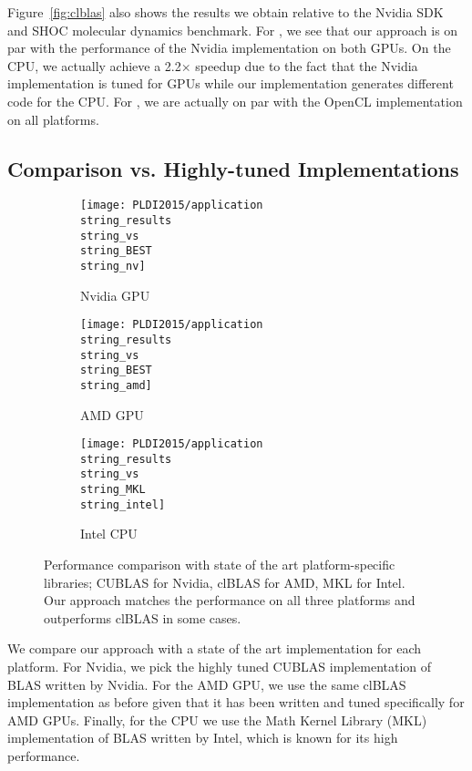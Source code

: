 Figure~\ref{fig:clblas} also shows the results we obtain relative to the Nvidia SDK  and SHOC molecular dynamics  benchmark.
For , we see that our approach is on par with the performance of the Nvidia implementation on both GPUs.
On the CPU, we actually achieve a 2.2$\times$ speedup due to the fact that the Nvidia implementation is tuned for GPUs while our implementation generates different code for the CPU.
For , we are actually on par with the OpenCL implementation on all platforms.

\subsection{Comparison vs. Highly-tuned Implementations}

\begin{figure*}[t]
  \centering
  \begin{subfigure}[b]{0.315\linewidth}
    \texttt{[image: PLDI2015/application\\string\_results\\string\_vs\\string\_BEST\\string\_nv]}
    \caption{Nvidia GPU}
    \label{fig:results-nv}
  \end{subfigure}
  \hspace{0.015\linewidth}
  \begin{subfigure}[b]{0.315\linewidth}
    \texttt{[image: PLDI2015/application\\string\_results\\string\_vs\\string\_BEST\\string\_amd]}
    \caption{AMD GPU}
    \label{fig:results-amd}
  \end{subfigure}
  \hspace{0.015\linewidth}
  \begin{subfigure}[b]{0.315\linewidth}
    \texttt{[image: PLDI2015/application\\string\_results\\string\_vs\\string\_MKL\\string\_intel]}
    \caption{Intel CPU}
    \label{fig:results-cpu}
  \end{subfigure}
  \vspace{-1.5em}
  \caption{Performance comparison with state of the art platform-specific libraries; CUBLAS for Nvidia, clBLAS for AMD, MKL for Intel.
           Our approach matches the performance on all three platforms and outperforms clBLAS in some cases.
         }
   \label{fig:results}
\end{figure*}

We compare our approach with a state of the art implementation for each platform.
For Nvidia, we pick the highly tuned CUBLAS implementation of BLAS written by Nvidia.
For the AMD GPU, we use the same clBLAS implementation as before given that it has been written and tuned specifically for AMD GPUs.
Finally, for the CPU we use the Math Kernel Library (MKL) implementation of BLAS written by Intel, which is known for its high performance.

